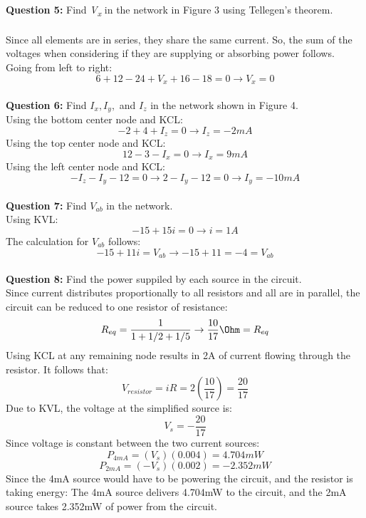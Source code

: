 \documentclass{article}
\begin{document}
\textbf{Question 5:} Find \textit{V\textsubscript{x}} in the network in Figure 3 using Tellegen's theorem.\\
\\
Since all elements are in series, they share the same current. So, the sum of the voltages when considering if they are supplying or absorbing power follows.\\
Going from left to right:
\[6+12-24+V_x+16-18=0 \rightarrow V_x = 0 \]
\\
\textbf{Question 6:} Find $I_x,I_y,$ and $I_z$ in the network shown in Figure 4.
\\
Using the bottom center node and KCL:
\[ -2 + 4 + I_z = 0 \rightarrow I_z = -2mA \]
Using the top center node and KCL:
\[12-3-I_x = 0 \rightarrow I_x = 9mA \]
Using the left center node and KCL:
\[ -I_z - I_y - 12 = 0 \rightarrow 2-I_y-12=0 \rightarrow I_y=-10mA \]
\\
\textbf{Question 7:} Find $V_{ab}$ in the network.
\\
Using KVL:
\[ -15 +15i = 0 \rightarrow i = 1A \]
The calculation for $V_{ab}$ follows:
\[ -15+11i = V_{ab} \rightarrow -15+11=-4=V_{ab} \]
\\
\textbf{Question 8:} Find the power suppiled by each source in the circuit.
\\
Since current distributes proportionally to all resistors and all are in parallel, the circuit can be reduced to one resistor of resistance:
\[ R_{eq} = \frac{1}{1+1/2+1/5} \rightarrow \frac{10}{17}\Ohm = R_{eq} \]
Using KCL at any remaining node results in 2A of current flowing through the resistor. It follows that:
\[ V_{resistor} = iR = 2(\frac{10}{17}) = \frac{20}{17} \]
Due to KVL, the voltage at the simplified source is:
\[ V_s = -\frac{20}{17} \]
Since voltage is constant between the two current sources:
\[ P_{4mA} = (V_s)(0.004) = 4.704mW \]
\[ P_{2mA} = (-V_s)(0.002) =-2.352mW \]
Since the 4mA source would have to be powering the circuit, and the resistor is taking energy:
The 4mA source delivers 4.704mW to the circuit, and the 2mA source takes 2.352mW of power from the circuit. 
\end{document}

